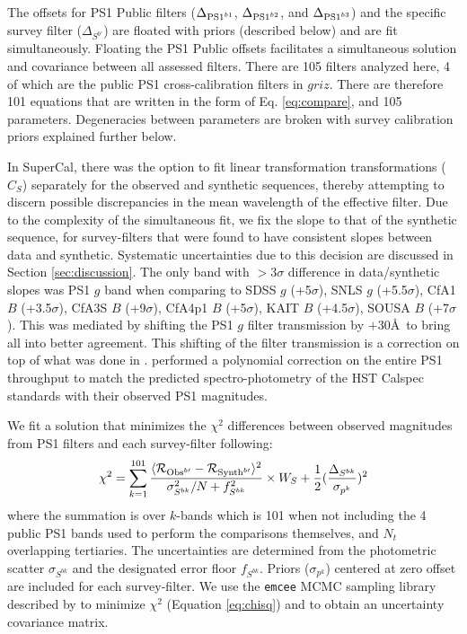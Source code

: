 \documentclass[twocolumn]{aastex63}
\newcommand{\blue}{\color{black}}
\newcommand{\red}{\color{black}}
\begin{document}
{\red The offsets for PS1 Public filters} ($\Delta_{{\rm PS1}^{b1}}$, $\Delta_{{\rm PS1}^{b2}}$, and $\Delta_{{\rm PS1}^{b3}}$) and the specific survey filter ($\Delta_{S^{b\prime}}$) are floated with priors (described below) and are fit simultaneously. {\red Floating the PS1 Public offsets facilitates a simultaneous solution and covariance between all assessed filters.}  There are 105 filters analyzed here, 4 of which are the public PS1 cross-calibration filters in $griz$.  There are therefore 101 equations that are written in the form of Eq. \ref{eq:compare}, and 105 parameters. Degeneracies between parameters are broken with survey calibration priors explained further below.

In SuperCal, there was the option to fit linear transformation transformations ($C_S$) separately for the observed and synthetic sequences, thereby attempting to discern possible discrepancies in the mean wavelength of the effective filter.  Due to the complexity of the simultaneous fit, we fix the slope to that of the synthetic sequence, for survey-filters that were found to have consistent slopes between data and synthetic. Systematic uncertainties due to this decision are discussed in Section \ref{sec:discussion}. {\blue The only band with $>3\sigma$ difference in data/synthetic slopes was PS1 $g$ band when comparing to SDSS $g$ (+5$\sigma$), SNLS $g$ (+5.5$\sigma$), CfA1 $B$ (+3.5$\sigma$), CfA3S $B$ (+9$\sigma$), CfA4p1 $B$ (+5$\sigma$), KAIT $B$ (+4.5$\sigma$), SOUSA $B$ (+7$\sigma$). This was mediated by shifting the PS1 $g$ filter transmission by $+30$\AA\ to bring all into better agreement. {\red This shifting of the filter transmission is a correction on top of what was done in \cite{Tonry12}. \cite{Tonry12} performed a polynomial correction on the entire PS1 throughput to match the predicted spectro-photometry of the HST Calspec standards with their observed PS1 magnitudes.} }


We fit a solution that minimizes the $\chi^2$ differences between observed magnitudes from PS1 filters and each survey-filter following:
\begin{equation}
\chi^2 = \sum_{k=1}^{101} \frac{\langle\mathcal{R}_{{\rm Obs}^{b\prime}}-\mathcal{R}_{{\rm Synth}^{b\prime}}\rangle^2}{\sigma_{S^{bk}}^2/N + f_{S^{bk}}^2} \times W_S + \frac{1}{2}(\frac{\Delta_{S^{bk}}}{\sigma_{p^k}})^2
\label{eq:chisq}
\end{equation}
where the summation is over $k$-bands {\red which is 101 when not including the 4 public PS1 bands used to perform the comparisons themselves}, and $N_t$ overlapping tertiaries. The uncertainties are determined from the {\red photometric scatter $\sigma_{S^{bk}}$} and the designated error floor $f_{S^{bk}}$. Priors ($\sigma_{p^k}$) centered at zero offset are included for each survey-filter. We use the \texttt{emcee} MCMC sampling library described by \cite{emcee} to minimize $\chi^2$ (Equation \ref{eq:chisq}) and to obtain an uncertainty covariance matrix.
    
\end{document}
